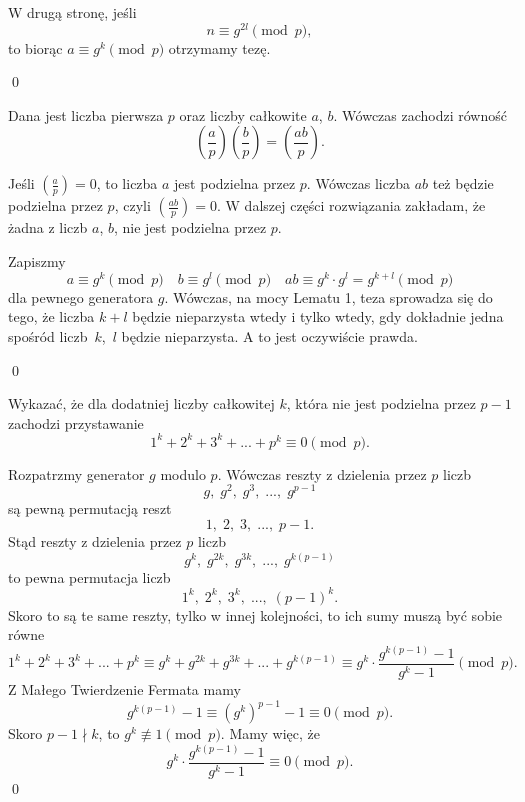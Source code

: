 \vspace{10px}
\noindent
W drugą stronę, jeśli
\[
	n \equiv g^{2l} \pmod{p},
\]
to biorąc $a \equiv g^k \pmod{p}$ otrzymamy tezę.

\qed
\vspace{10px}


\noindent
Dana jest liczba pierwsza $p$ oraz liczby całkowite $a$, $b$. Wówczas zachodzi równość
\[
	\left(\frac{a}{p}\right)\left(\frac{b}{p}\right) = \left(\frac{ab}{p}\right).
\]


\noindent
Jeśli $\left(\frac{a}{p}\right) = 0$, to liczba $a$ jest podzielna przez $p$. Wówczas liczba $ab$ też będzie podzielna przez $p$, czyli $\left(\frac{ab}{p}\right) = 0$. W dalszej części rozwiązania zakładam, że żadna z liczb $a$, $b$, nie jest podzielna przez $p$.

\noindent
Zapiszmy
\[
	a \equiv g^k \pmod{p} \quad b \equiv g^l \pmod{p} \quad ab \equiv g^k \cdot g^l = g^{k + l} \pmod{p}
\]
dla pewnego generatora $g$. Wówczas, na mocy Lematu 1, teza sprowadza się do tego, że liczba $k + l$ będzie nieparzysta wtedy i tylko wtedy, gdy dokładnie jedna spośród liczb~$k$,~$l$ będzie nieparzysta. A to jest oczywiście prawda.

\qed

\vspace{10px}


\noindent
Wykazać, że dla dodatniej liczby całkowitej $k$, która nie jest podzielna przez $p - 1$ zachodzi przystawanie
\[
	1^k + 2^k + 3^k + ... + p^k \equiv 0 \pmod{p}.
\]

\vspace{10px}


\noindent
Rozpatrzmy generator $g$ modulo $p$. Wówczas reszty z dzielenia przez $p$ liczb
\[
	g,\; g^2,\; g^3,\; ...,\; g^{p - 1}
\]
są pewną permutacją reszt
\[
	1,\; 2,\; 3,\; ...,\;  p - 1.
\]
Stąd reszty z dzielenia przez $p$ liczb
\[
	g^k,\; g^{2k},\; g^{3k},\; ...,\; g^{k(p - 1)}
\]
to pewna permutacja liczb
\[
	1^k,\; 2^k,\; 3^k,\; ...,\;  (p - 1)^k.
\]
Skoro to są te same reszty, tylko w innej kolejności, to ich sumy muszą być sobie równe
\[
	1^k + 2^k + 3^k + ... + p^k \equiv g^k + g^{2k} + g^{3k} +  ... + g^{k(p - 1)} \equiv g^k \cdot \frac{g^{k(p - 1)} - 1}{g^k - 1} \pmod{p}.
\]
Z Małego Twierdzenie Fermata mamy
\[
	g^{k(p - 1)} - 1 \equiv \left(g^{k}\right)^{p - 1} - 1 \equiv 0 \pmod{p}. 
\]
Skoro $p - 1 \nmid k$, to $g^k \not\equiv 1 \pmod{p}$. Mamy więc, że
\[
	g^k \cdot \frac{g^{k(p - 1)} - 1}{g^k - 1} \equiv 0 \pmod{p}.
\]
\qed
